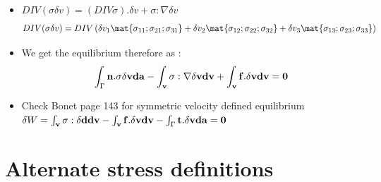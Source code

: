 	\begin{frame}{}
		\begin{itemize}
			\item $DIV\left(\sigma \delta v \right) = (DIV \sigma). \delta v + \sigma : \nabla \delta v$
			\begin{equation}
			\begin{aligned}
			DIV(\sigma \delta v) = DIV
			\left(\delta v_1\mat{\sigma_{11};\sigma_{21};\sigma_{31}} 
			+ \delta v_2\mat{\sigma_{12};\sigma_{22};\sigma_{32}}
			+ \delta v_3\mat{\sigma_{13};\sigma_{23};\sigma_{33}}\right)
			\end{aligned}
			\end{equation}
			
			\item We get the equilibrium therefore as :
			\begin{equation}
			\int_{\Gamma}\mathbf{ n.\sigma \delta v da - \int_v \sigma : \nabla \delta v dv + \int_v f.\delta v dv = 0 }
			\end{equation}
			\item Check Bonet page 143 for symmetric velocity defined equilibrium
			$\delta W = \mathbf{\int_{v} \sigma : \delta d dv - \int_v f.\delta v dv }- \int_\Gamma \mathbf{t.\delta v da= 0} $			
		\end{itemize}
		
	\end{frame}


\section{Alternate stress definitions}

